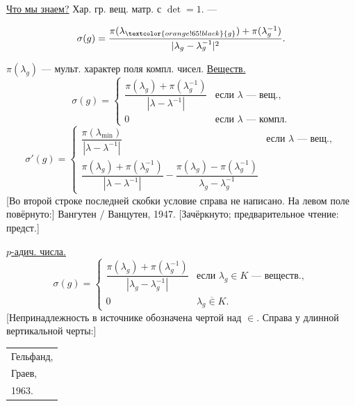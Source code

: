 \underline{Что мы знаем?} Хар. гр. вещ. матр. с $\det=1$.
 ---
\par\noindent\begin{minipage}{\linewidth}
\begin{equation*}
\sigma(g)=\frac{\pi(\lambda_{\textcolor{orange!65!black}{g}})+\pi(\lambda_g^{-1})}{|\lambda_g-\lambda_g^{-1}|^2}.
\end{equation*}
\end{minipage}\par
[Справа: Гельфанд, Наймарк, 1947.]
$\pi(\lambda_g)$ --- мульт. характер поля компл. чисел.
\underline{Веществ.}
\begin{equation*}
\sigma(g)=\begin{cases}
\dfrac{\pi(\lambda_g)+\pi(\lambda_g^{-1})}{|\lambda-\lambda^{-1}|}&\text{если }\lambda\text{ --- вещ.},\\
0&\text{если }\lambda\text{ --- компл.}
\end{cases}
\end{equation*}
\begin{equation*}
\sigma'(g)=\begin{cases}
\dfrac{\pi(\lambda_{\min})}{|\lambda-\lambda^{-1}|}&\text{если }\lambda\text{ --- вещ.},\\
\dfrac{\pi(\lambda_g)+\pi(\lambda_g^{-1})}{|\lambda-\lambda^{-1}|}
-\dfrac{\pi(\lambda_g)-\pi(\lambda_g^{-1})}{\lambda_g-\lambda_g^{-1}}&
\end{cases}
\end{equation*}
[Во второй строке последней скобки условие справа не написано. На левом поле повёрнуто:]
\textcolor{orange!65!black}{Вангутен / Ванцутен}, 1947.
[Зачёркнуто; предварительное чтение: \textcolor{orange!65!black}{предст.}]
\par\noindent\begin{minipage}{\linewidth}
\underline{$p$-адич. числа.}
\begin{equation*}
\sigma(g)=\begin{cases}
\dfrac{\pi(\lambda_g)+\pi(\lambda_g^{-1})}{|\lambda_g-\lambda_g^{-1}|}&\text{если }\lambda_g\in K\text{ --- веществ.},\\
0&\lambda_g{\overline{\in}}K.
\end{cases}
\end{equation*}
[Непринадлежность в источнике обозначена чертой над $\in$. Справа у длинной вертикальной черты:]
\begin{tabular}{|l}Гельфанд,\\Граев,\\1963.\end{tabular}
\end{minipage}\par\medskip
